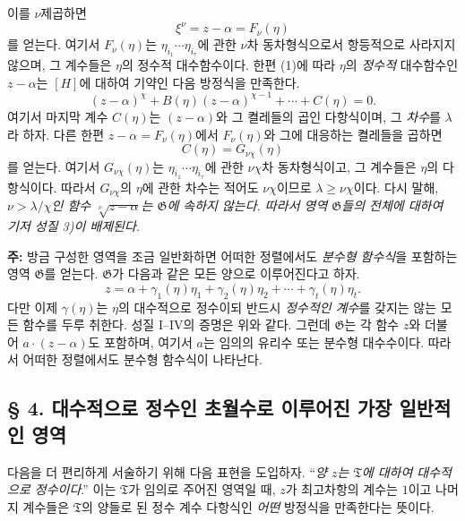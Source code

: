 이를 $\nu$제곱하면
\[
 \xi^\nu=z-\alpha=F_\nu(\eta)
\]
를 얻는다. 여기서 $F_\nu(\eta)$는 $\eta_{i_1}\cdots\eta_{i_\tau}$에 관한 $\nu$차 동차형식으로서 항등적으로 사라지지 않으며, 그 계수들은 $\eta$의 정수적 대수함수이다. 한편 (1)에 따라 $\eta$의 \emph{정수적} 대수함수인 $z-\alpha$는 $[H]$에 대하여 기약인 다음 방정식을 만족한다.
\[
 (z-\alpha)^\chi+B(\eta)(z-\alpha)^{\chi-1}+\cdots+C(\eta)=0.
\]
여기서 마지막 계수 $C(\eta)$는 $(z-\alpha)$와 그 켤레들의 곱인 다항식이며, 그 \emph{차수}를 $\lambda$라 하자. 다른 한편 $z-\alpha=F_\nu(\eta)$에서 $F_\nu(\eta)$와 그에 대응하는 켤레들을 곱하면
\[
 C(\eta)=G_{\nu\chi}(\eta)
\]
를 얻는다. 여기서 $G_{\nu\chi}(\eta)$는 $\eta_{i_1}\cdots\eta_{i_\tau}$에 관한 $\nu\chi$차 동차형식이고, 그 계수들은 $\eta$의 다항식이다. 따라서 $G_{\nu\chi}$의 $\eta$에 관한 차수는 적어도 $\nu\chi$이므로 $\lambda\geq\nu\chi$이다. 다시 말해, \emph{$\nu>\lambda/\chi$인 함수 $\sqrt[\nu]{z-\alpha}$는 $\mathfrak G$에 속하지 않는다. 따라서 영역 $\mathfrak G$들의 전체에 대하여 기저 성질 3)이 배제된다.}

\textbf{주:} 방금 구성한 영역을 조금 일반화하면 어떠한 정렬에서도 \emph{분수형 함수식}을 포함하는 영역 $\mathfrak G$를 얻는다. $\mathfrak G$가 다음과 같은 모든 양으로 이루어진다고 하자.
\[
 z=\alpha+\gamma_1(\eta)\eta_1+\gamma_2(\eta)\eta_2
      +\cdots+\gamma_t(\eta)\eta_t.
\]
다만 이제 $\gamma(\eta)$는 $\eta$의 대수적으로 정수이되 반드시 \emph{정수적인 계수}를 갖지는 않는 모든 함수를 두루 취한다. 성질 I--IV의 증명은 위와 같다. 그런데 $\mathfrak G$는 각 함수 $z$와 더불어 $a\cdot(z-\alpha)$도 포함하며, 여기서 $a$는 임의의 유리수 또는 분수형 대수수이다. 따라서 어떠한 정렬에서도 분수형 함수식이 나타난다.

\subsection*{§ 4. 대수적으로 정수인 초월수로 이루어진 가장 일반적인 영역}

다음을 더 편리하게 서술하기 위해 다음 표현을 도입하자. ``\emph{양 $z$는 $\mathfrak T$에 대하여 대수적으로 정수이다}.'' 이는 $\mathfrak T$가 임의로 주어진 영역일 때, $z$가 최고차항의 계수는 $1$이고 나머지 계수들은 $\mathfrak T$의 양들로 된 정수 계수 다항식인 \emph{어떤} 방정식을 만족한다는 뜻이다.

